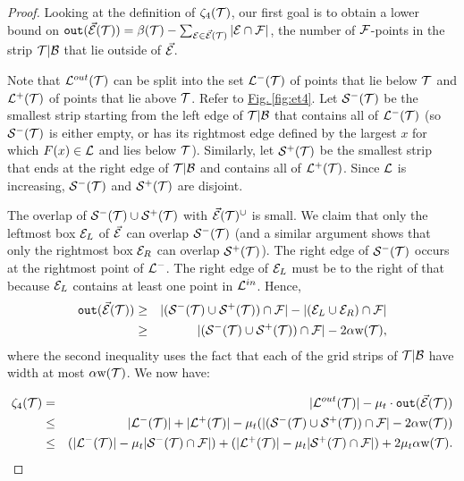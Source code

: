 \documentclass{acmsmall}
\newcommand{\cB}{{\cal B}}
\newcommand{\cE}{{\cal E}}
\newcommand{\cF}{{\cal F}}
\newcommand{\cL}{{\cal L}}
\newcommand{\cS}{{\cal S}}
\newcommand{\cT}{{\cal T}}
\newcommand{\Fig}[1]{\hyperref[fig:#1]{Fig.\,\ref*{fig:#1}}} %
\newcommand{\outside}{{\tt out}}
\newcommand{\strip}[2]{#1|#2}
\newcommand{\width}{{\bf {\rm  w}}}
\newcommand{\gridprec}{\alpha}
\newcommand{\errorterm}{\zeta}
\begin{document}
\begin{proof}
Looking at the definition of $\errorterm_4(\cT)$, 
our first goal is to obtain a lower bound on 
$\outside(\vec{\cE}(\cT)) = \beta(\cT)-\sum_{\cE \in \vec{\cE}(\cT)}|\cE \cap \cF|$, the number of $\cF$-points in the strip $\strip{\cT}{\cB}$ that lie outside of $\vec{\cE}$.

Note that $\cL^{out}(\cT)$ can be split
into the set $\cL^{-}(\cT)$ of points that lie below $\cT$ and $\cL^{+}(\cT)$ of points that lie above $\cT$.
Refer to \Fig{et4}.
Let $\cS^-(\cT)$ be the smallest strip starting from the left edge of $\strip{\cT}{\cB}$ that contains all of $\cL^{-}(\cT)$ (so $\cS^-(\cT)$ is
either empty, or has its rightmost edge defined by the largest $x$ for which $F(x) \in \cL$ and lies below $\cT$).
Similarly, let $\cS^+(\cT)$ be the smallest strip that ends at the right edge of $\strip{\cT}{\cB}$ and contains all of $\cL^+(\cT)$.
Since $\cL$ is increasing, $\cS^-(\cT)$ and $\cS^+(\cT)$ are disjoint. 

The overlap of $\cS^-(\cT) \cup \cS^+(\cT)$ with $\vec{\cE}(\cT)^{\cup}$ is small.
We claim that only the leftmost box $\cE_L$ of
$\vec{\cE}$ can overlap $\cS^-(\cT)$ (and a similar argument shows that only the rightmost box $\cE_R$ can overlap $\cS^+(\cT)$). 
The right edge of $\cS^-(\cT)$ occurs
at the rightmost point of $\cL^-$. The right edge of $\cE_L$ must be to the right of that because
$\cE_L$ contains at least one point in $\cL^{in}$.
Hence,
\begin{eqnarray*}
\outside(\vec{\cE}(\cT)) & \geq & |(\cS^-(\cT)\cup \cS^+(\cT)) \cap \cF| - |(\cE_L \cup \cE_R) \cap \cF|\\
& \geq & |(\cS^-(\cT)\cup \cS^+(\cT)) \cap \cF| - 2\gridprec \width(\cT),
\end{eqnarray*}
where the second inequality 
uses the fact that each of the grid strips of $\strip{\cT}{\cB}$ have width at most $\gridprec \width(\cT)$.
We now have:

\begin{eqnarray*}
\errorterm_4(\cT) 
& = & |\cL^{out}(\cT)| - \mu_t\cdot\outside(\vec{\cE}(\cT))\\
 & \leq & |\cL^-(\cT)|+|\cL^+(\cT)| - \mu_t(|(\cS^-(\cT)\cup \cS^+(\cT)) \cap \cF| - 2\gridprec \width(\cT))\\
& \leq &(|\cL^-(\cT)|-\mu_t|\cS^-(\cT) \cap \cF|)+(|\cL^+(\cT)| - \mu_t| \cS^+(\cT) \cap \cF|) + 2\mu_t\gridprec \width(\cT).
\end{eqnarray*}



\end{proof}
\end{document}
